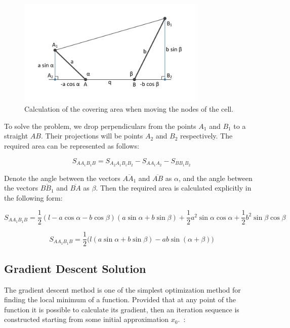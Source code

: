 \documentclass[
11pt,%
tightenlines,%
twoside,%
onecolumn,%
nofloats,%
nobibnotes,%
nofootinbib,%
superscriptaddress,%
noshowpacs,%
centertags]%
{revtex4}
\begin{document}
\begin{figure}[h]
\setcaptionmargin{5mm}
\onelinecaptionstrue
\includegraphics[width=0.8\textwidth]{pics/local.pdf}
\caption{Calculation of the covering area when moving the nodes of the cell.}
\label{fig:local}
\end{figure}

To solve the problem, we drop perpendiculars from the points $A_1$ and $B_1$ to a straight $AB$.
Their projections will be points $A_2$ and $B_2$ respectively.
The required area can be represented as follows:

\begin{equation}
S_{AA_1B_1B} = S_{A_2A_1B_1B_2} - S_{AA_1A_2} - S_{BB_1B_2}
\end{equation}

Denote the angle between the vectors $\overline{AA_1}$ and $\overline{AB}$ as $\alpha$, and the angle between the vectors $\overline{BB_1}$ and $\overline{BA}$ as $\beta$.
Then the required area is calculated explicitly in the following form:

\begin{equation}
S_{AA_1B_1B} = \frac{1}{2}(l - a \cos \alpha - b \cos \beta)(a \sin \alpha + b \sin \beta) + \frac{1}{2}a^2 \sin \alpha \cos \alpha + \frac{1}{2}b^2 \sin \beta \cos \beta
\end{equation}

\begin{equation}
S_{AA_1B_1B} = \frac{1}{2}\big(l(a \sin \alpha + b \sin \beta) - ab \sin(\alpha + \beta)\big)
\end{equation}

\subsection{Gradient Descent Solution}

The gradient descent method is one of the simplest optimization method for finding the local minimum of a function.
Provided that at any point of the function it is possible to calculate its gradient, then an iteration sequence is constructed starting from some initial approximation $x_0$.~\cite{Kantorovich}:
\end{document}
